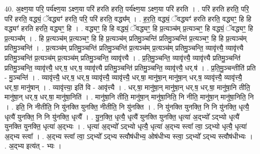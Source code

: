 \documentclass[17pt]{extarticle}
\begin{document}
40. अ॒क्ष्ण॒या परि॒ पर्य॑क्ष्ण॒या ऽक्ष्ण॒या परि॑ हरति हरति॒ पर्य॑क्ष्ण॒या ऽक्ष्ण॒या परि॑ हरति । . परि॑ हरति हरति॒ परि॒ परि॑ हरति॒ वद्ध्यं॒ ॅवद्ध्यꣳ॑ हरति॒ परि॒ परि॑ हरति॒ वद्ध्य᳚म् । . ह॒र॒ति॒ वद्ध्यं॒ ॅवद्ध्यꣳ॑ हरति हरति॒ वद्ध्यꣳ॒॒ हि हि वद्ध्यꣳ॑ हरति हरति॒ वद्ध्यꣳ॒॒ हि । . वद्ध्यꣳ॒॒ हि हि वद्ध्यं॒ ॅवद्ध्यꣳ॒॒ हि प्र॒त्यञ्च॑म् प्र॒त्यञ्चꣳ॒॒ हि वद्ध्यं॒ ॅवद्ध्यꣳ॒॒ हि प्र॒त्यञ्च᳚म् । . हि प्र॒त्यञ्च॑म् प्र॒त्यञ्चꣳ॒॒ हि हि प्र॒त्यञ्च॑म् प्रतिमु॒ञ्चन्ति॑ प्रतिमु॒ञ्चन्ति॑ प्र॒त्यञ्चꣳ॒॒ हि हि प्र॒त्यञ्च॑म् प्रतिमु॒ञ्चन्ति॑ । . प्र॒त्यञ्च॑म् प्रतिमु॒ञ्चन्ति॑ प्रतिमु॒ञ्चन्ति॑ प्र॒त्यञ्च॑म् प्र॒त्यञ्च॑म् प्रतिमु॒ञ्चन्ति॒ व्यावृ॑त्त्यै॒ व्यावृ॑त्त्यै प्रतिमु॒ञ्चन्ति॑ प्र॒त्यञ्च॑म् प्र॒त्यञ्च॑म् प्रतिमु॒ञ्चन्ति॒ व्यावृ॑त्त्यै । . प्र॒ति॒मु॒ञ्चन्ति॒ व्यावृ॑त्त्यै॒ व्यावृ॑त्त्यै प्रतिमु॒ञ्चन्ति॑ प्रतिमु॒ञ्चन्ति॒ व्यावृ॑त्त्यै॒ धर्.ष॒ धर्.ष॒ व्यावृ॑त्त्यै प्रतिमु॒ञ्चन्ति॑ प्रतिमु॒ञ्चन्ति॒ व्यावृ॑त्त्यै॒ धर्.ष॑ । . प्र॒ति॒मु॒ञ्चन्तीति॑ प्रति - मु॒ञ्चन्ति॑ । . व्यावृ॑त्त्यै॒ धर्.ष॒ धर्.ष॒ व्यावृ॑त्त्यै॒ व्यावृ॑त्त्यै॒ धर्.षा॒ मानु॑षा॒न् मानु॑षा॒न् धर्.ष॒ व्यावृ॑त्त्यै॒ व्यावृ॑त्त्यै॒ धर्.षा॒ मानु॑षान् । . व्यावृ॑त्त्या॒ इति॑ वि - आवृ॑त्त्यै । . धर्.षा॒ मानु॑षा॒न् मानु॑षा॒न् धर्.ष॒ धर्.षा॒ मानु॑षा॒नि तीति॒ मानु॑षा॒न् धर्.ष॒ धर्.षा॒ मानु॑षा॒निति॑ । . मानु॑षा॒नि तीति॒ मानु॑षा॒न् मानु॑षा॒निति॒ नि नीति॒ मानु॑षा॒न् मानु॑षा॒निति॒ नि । . इति॒ नि नीतीति॒ नि यु॑नक्ति युनक्ति॒ नीतीति॒ नि यु॑नक्ति । . नि यु॑नक्ति युनक्ति॒ नि नि यु॑नक्ति॒ धृत्यै॒ धृत्यै॑ युनक्ति॒ नि नि यु॑नक्ति॒ धृत्यै᳚ । . यु॒न॒क्ति॒ धृत्यै॒ धृत्यै॑ युनक्ति युनक्ति॒ धृत्या॑ अ॒द्भ्यो᳚ ऽद्भ्यो धृत्यै॑ युनक्ति युनक्ति॒ धृत्या॑ अ॒द्भ्यः । . धृत्या॑ अ॒द्भ्यो᳚ ऽद्भ्यो धृत्यै॒ धृत्या॑ अ॒द्भ्य स्त्वा᳚ त्वा॒ ऽद्भ्यो धृत्यै॒ धृत्या॑ अ॒द्भ्य स्त्वा᳚ । . अ॒द्भ्य स्त्वा᳚ त्वा॒ ऽद्भ्यो᳚ ऽद्भ्य स्त्वौष॑धीभ्य॒ ओष॑धीभ्य स्त्वा॒ ऽद्भ्यो᳚ ऽद्भ्य स्त्वौष॑धीभ्यः । . अ॒द्भ्य इत्य॑त् - भ्यः । \newline
\pagebreak
{}
\end{document}
